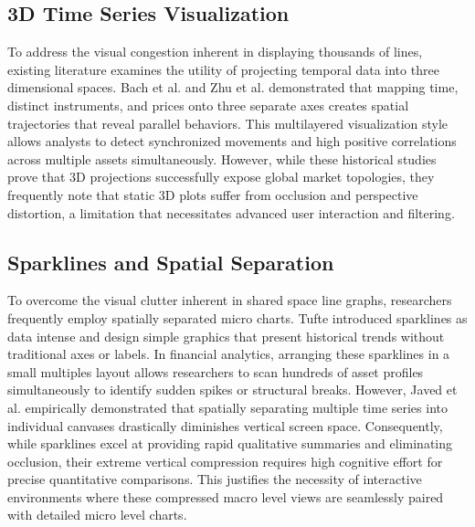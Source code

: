 \documentclass[final,3p,times,twocolumn]{elsarticle}
\begin{document}
\subsection{3D Time Series Visualization}\label{sec_3D_plot}
To address the visual congestion inherent in displaying thousands of lines, existing literature examines the utility of projecting temporal data into three dimensional spaces. Bach et al. \cite{bach2014review} and Zhu et al. \cite{zhu2012visualizing} demonstrated that mapping time, distinct instruments, and prices onto three separate axes creates spatial trajectories that reveal parallel behaviors. This multilayered visualization style allows analysts to detect synchronized movements and high positive correlations across multiple assets simultaneously. However, while these historical studies prove that 3D projections successfully expose global market topologies, they frequently note that static 3D plots suffer from occlusion and perspective distortion, a limitation that necessitates advanced user interaction and filtering.

\subsection{Sparklines and Spatial Separation}\label{sec_sparklines}
To overcome the visual clutter inherent in shared space line graphs, researchers frequently employ spatially separated micro charts. Tufte \cite{tufte2006beautiful} introduced sparklines as data intense and design simple graphics that present historical trends without traditional axes or labels. In financial analytics, arranging these sparklines in a small multiples layout allows researchers to scan hundreds of asset profiles simultaneously to identify sudden spikes or structural breaks. However, Javed et al. \cite{javed2010graphical} empirically demonstrated that spatially separating multiple time series into individual canvases drastically diminishes vertical screen space. Consequently, while sparklines excel at providing rapid qualitative summaries and eliminating occlusion, their extreme vertical compression requires high cognitive effort for precise quantitative comparisons. This justifies the necessity of interactive environments where these compressed macro level views are seamlessly paired with detailed micro level charts.
\end{document}
